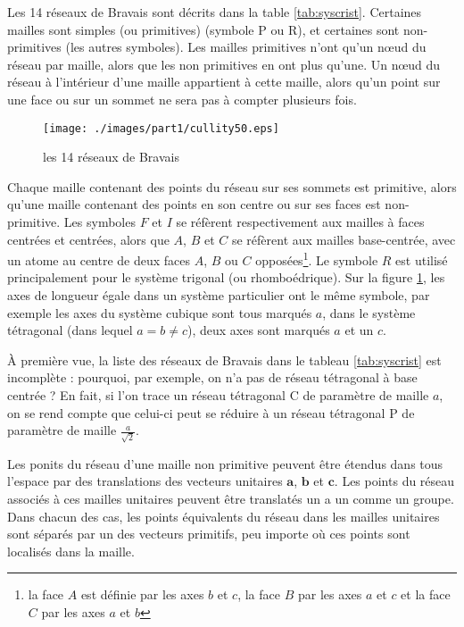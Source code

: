 Les 14 réseaux de Bravais sont décrits dans la table \ref{tab:syscrist}.
Certaines mailles sont simples (ou primitives) (symbole P ou R), et certaines
sont non-primitives (les autres symboles). Les mailles primitives n'ont qu'un
nœud du réseau par maille, alors que les non primitives en ont plus qu'une. Un
nœud du réseau à l'intérieur d'une maille appartient à cette maille, alors qu'un
point sur une face ou sur un sommet ne sera pas à compter plusieurs fois.

\begin{figure}
    \texttt{[image: ./images/part1/cullity50.eps]}
    \caption{les 14 réseaux de Bravais}
    \label{fig:bravaisschema}
\end{figure}

Chaque maille contenant des points du réseau sur ses sommets est primitive, alors
qu'une maille contenant des points en son centre ou sur ses faces est
non-primitive. Les symboles $F$ et $I$ se réfèrent respectivement aux mailles à
faces centrées et centrées, alors que $A$, $B$ et $C$ se réfèrent aux mailles
base-centrée, avec un atome au centre de deux faces $A$, $B$ ou $C$
opposées\footnote{la face $A$ est définie par les axes $b$ et $c$, la face $B$
par les axes $a$ et $c$ et la face $C$ par les axes $a$ et $b$}. Le symbole $R$
est utilisé principalement pour le système trigonal (ou rhomboédrique). Sur la
figure \ref{fig:bravaisschema}, les axes de longueur égale dans un système
particulier ont le même symbole, par exemple les axes du système cubique sont
tous marqués $a$, dans le système tétragonal (dans lequel $a = b \neq c$), deux
axes sont marqués $a$ et un $c$.

À première vue, la liste des réseaux de Bravais dans le tableau
\ref{tab:syscrist} est incomplète : pourquoi, par exemple, on n'a pas de réseau
tétragonal à base centrée ? En fait, si l'on trace un réseau tétragonal C de
paramètre de maille $a$, on se rend compte que celui-ci peut se réduire à un
réseau tétragonal P de paramètre de maille $\frac{a}{\sqrt{2}}$.

Les ponits du réseau d'une maille non primitive peuvent être étendus dans tous
l'espace par des translations des vecteurs unitaires $\mathbf{a}$, $\mathbf{b}$
et $\mathbf{c}$. Les points du réseau associés à ces mailles unitaires peuvent
être translatés un a un comme un groupe. Dans chacun des cas, les points
équivalents du réseau dans les mailles unitaires sont séparés par un des vecteurs
primitifs, peu importe où ces points sont localisés dans la maille.

